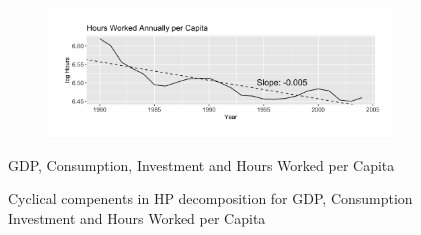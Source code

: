 \documentclass[12pt]{article}
\begin{document}
\begin{figure}
\begin{subfigure}[b]{1\textwidth}
    \end{subfigure}
    \vspace{-20pt}
    \begin{subfigure}[b]{1\textwidth}
        \includegraphics[width=\textwidth]{OUTPUT/MEDIA/loghours_pc.png}
    \end{subfigure}
    \caption{GDP, Consumption, Investment and Hours Worked per Capita}
    \label{fig:descriptive}
\end{figure}
\clearpage %

\begin{figure}[h]
    \centering
    \hspace{-20pt}
    \caption{Cyclical compenents in HP decomposition for GDP, Consumption Investment and Hours Worked per Capita}
    \label{fig:cycles}
\end{figure}
\newpage
\end{document}
